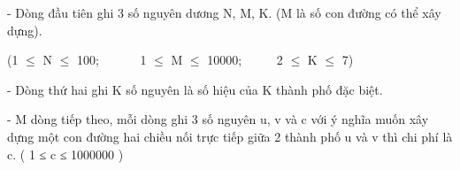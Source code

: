 - Dòng đầu tiên ghi 3 số nguyên dương N, M, K. (M là số con đường có thể xây dựng).

(1  $\le$  N  $\le$  100;       1  $\le$  M  $\le$  10000;      2  $\le$  K  $\le$  7)

- Dòng thứ hai ghi K số nguyên là số hiệu của K thành phố đặc biệt.

- M dòng tiếp theo, mỗi dòng ghi 3 số nguyên u, v và c với ý nghĩa muốn xây dựng một con đường hai chiều nối trực tiếp giữa 2 thành phố u và v thì chi phí là c. ( 1 ≤ c ≤ 1000000 )

 